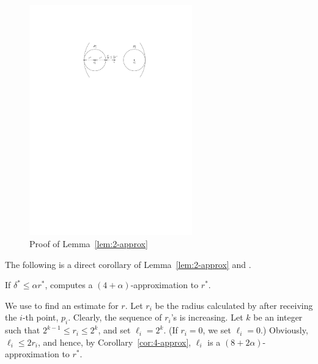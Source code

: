\documentclass[envcountsame]{cls/cccg15}
\newcommand{\ceil}[1]{\left\lceil{#1}\right\rceil}
\newcommand{\lee}{\leqslant}
\newcommand{\gee}{\geqslant}
\renewcommand{\le}{\lee}
\renewcommand{\ge}{\gee}
\newcommand{\eps}{\varepsilon}
\begin{document}
\begin{figure}[t]
	\centering
	\includegraphics[width=19em]{figs/2lt1}
	\caption{Proof of Lemma~\ref{lem:2-approx}}
	\label{fig:2lt1}
\end{figure}

\noindent 
The following is a direct corollary of Lemma~\ref{lem:2-approx} and .

\begin{cor} \label{cor:4-approx}
	If $\delta^* \le \alpha r^*$, 
	 computes a $(4 + \alpha)$-approximation to $r^*$. 
\end{cor}




We use  to find an estimate for $r$. 
Let $r_i$ be the radius calculated by  after receiving
the $i$-th point, $p_i$.
Clearly, the sequence of $r_i$'s is increasing.
Let $k$ be an integer such that $2^{k-1} \le r_i \le 2^{k}$, and set $\ell_i = 2^{k}$.
(If $r_i = 0$, we set $\ell_i = 0$.)
Obviously, $\ell_i \le 2 r_i$,
and hence, by Corollary~\ref{cor:4-approx}, 
$\ell_i$ is a $(8 + 2\alpha)$-approximation to $r^*$.
\end{document}
